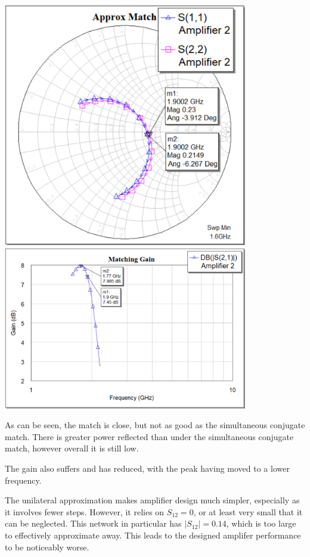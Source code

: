 \documentclass[12pt]{article}
\begin{document}
\begin{center}
\includegraphics[width=0.8\textwidth]{4 match.png}
\includegraphics[width=0.8\textwidth]{4 gain.png}
\end{center}

As can be seen, the match is close, but not as good as the simultaneous conjugate match. 
There is greater power reflected than under the simultaneous conjugate match, however overall it is still low.

The gain also suffers and has reduced, with the peak having moved to a lower frequency. 

The unilateral approximation makes amplifier design much simpler, especially as it involves fewer steps. 
However, it relies on $S_{12} = 0$, or at least very small that it can be neglected. 
This network in particular has $\lvert S_{12}\lvert = 0.14$, which is too large to effectively approximate away.
This leads to the designed amplifer performance to be noticeably worse. 
\end{document}
